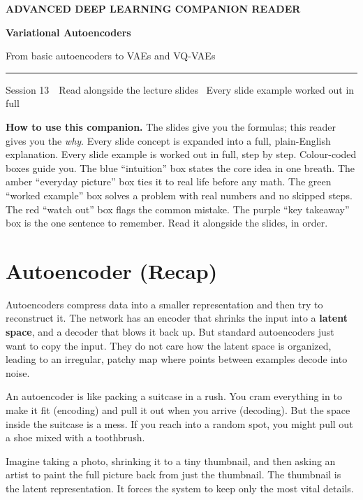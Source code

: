 \documentclass[a4paper,11pt]{article}
\newcommand{\SessionNo}{13}                 %
\providecommand{\addfontfeatureslike}[1]{#1}
\newcommand{\titlebanner}[4]{%
  \begin{tcolorbox}[
    enhanced, breakable=false,
    colback=navy, colframe=navy,
    boxrule=0pt, arc=3pt, outer arc=3pt,
    left=16pt, right=16pt, top=16pt, bottom=16pt,
    before skip=2pt, after skip=14pt,
    width=\linewidth ]
    {\sffamily\footnotesize\bfseries\color{white!85}%
      \MakeUppercase{\addfontfeatureslike{#1}}}\par
    \vspace{6pt}
    {\sffamily\bfseries\fontsize{30}{34}\selectfont\color{white} #2\par}
    \vspace{5pt}
    {\sffamily\large\color{white!88} #3\par}
    \vspace{9pt}
    {\color{white!55}\rule{\linewidth}{0.4pt}}\par
    \vspace{6pt}
    {\sffamily\footnotesize\color{white!82} #4\par}
  \end{tcolorbox}%
}
\newcommand{\vocab}[1]{\textbf{\color{navy}#1}}
\begin{document}
\thispagestyle{fancy}
\titlebanner
  {Advanced Deep Learning Companion Reader}%
  {Variational Autoencoders}                                                        %
  {From basic autoencoders to VAEs and VQ-VAEs}                                                    %
  {Session \SessionNo\ \textperiodcentered\ Read alongside the lecture slides \textperiodcentered\ Every slide example worked out in full} %

\noindent\textbf{How to use this companion.}
The slides give you the formulas; this reader gives you the \emph{why}. Every
slide concept is expanded into a full, plain-English explanation. Every
slide example is worked out in full, step by step. Colour-coded boxes guide you.
The blue ``intuition'' box states the core idea in one breath.
The amber ``everyday picture'' box ties it to real life before any math.
The green ``worked example'' box solves a problem with real numbers and no skipped steps.
The red ``watch out'' box flags the common mistake.
The purple ``key takeaway'' box is the one sentence to remember. Read it alongside the slides, in order.
\medskip

\section{Autoencoder (Recap)}
Autoencoders compress data into a smaller representation and then try to reconstruct it. The network has an encoder that shrinks the input into a \vocab{latent space}, and a decoder that blows it back up. But standard autoencoders just want to copy the input. They do not care how the latent space is organized, leading to an irregular, patchy map where points between examples decode into noise.

\begin{intuition}
An autoencoder is like packing a suitcase in a rush. You cram everything in to make it fit (encoding) and pull it out when you arrive (decoding). But the space inside the suitcase is a mess. If you reach into a random spot, you might pull out a shoe mixed with a toothbrush.
\end{intuition}

\begin{everyday}
Imagine taking a photo, shrinking it to a tiny thumbnail, and then asking an artist to paint the full picture back from just the thumbnail. The thumbnail is the latent representation. It forces the system to keep only the most vital details.
\end{everyday}
\end{document}
